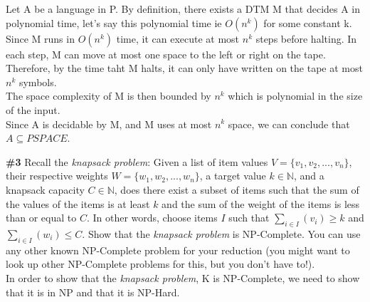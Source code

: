 \documentclass{article}
\newcommand{\problem}[1]{\textbf{\##1}}
\begin{document}
Let A be a language in P. By definition, there exists a DTM M that decides A in polynomial time, let's say this polynomial time ie $O(n^k)$ for some constant k.\\

Since M runs in $O(n^k)$ time, it can execute at most $n^k$ steps before halting. In each step, M can move at most one space to the left or right on the tape. Therefore, by the time taht M halts, it can only have written on the tape at most $n^k$ symbols.\\

The space complexity of M is then bounded by $n^k$ which is polynomial in the size of the input.\\

Since A is decidable by M, and M uses at most $n^k$ space, we can conclude that $A \subseteq PSPACE$.\\

\pagebreak

\problem{3} Recall the \emph{knapsack problem}: Given a list of item values $V = \{v_1,v_2,...,v_n\}$, their respective weights $W = \{w_1,w_2,...,w_n\}$, a target value $k \in \mathbb{N}$, and a knapsack capacity $C \in \mathbb{N}$, does there exist a subset of items such that the sum of the values of the items is at least $k$ and the sum of the weight of the items is less than or equal to $C$. In other words, choose items $I$ such that $\sum_{i \in I}(v_i) \geq k$ and $\sum_{i \in I}(w_i) \leq C$. Show that the \emph{knapsack problem} is NP-Complete. You can use any other known NP-Complete problem for your reduction (you might want to look up other NP-Complete problems for this, but you don't have to!).\\

In order to show that the \emph{knapsack problem}, K is NP-Complete, we need to show that it is in NP and that it is NP-Hard.\\
\end{document}
